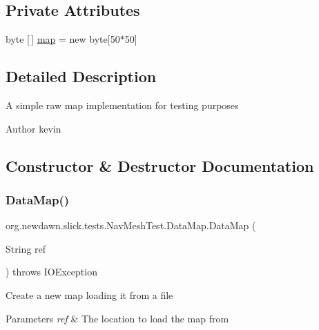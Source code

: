 \subsection*{Private Attributes}
\begin{DoxyCompactItemize}
\item 
byte \mbox{[}$\,$\mbox{]} \mbox{\hyperlink{classorg_1_1newdawn_1_1slick_1_1tests_1_1_nav_mesh_test_1_1_data_map_a53320b21368a0f1e144396488d4ae3ee}{map}} = new byte\mbox{[}50$\ast$50\mbox{]}
\end{DoxyCompactItemize}


\subsection{Detailed Description}
A simple raw map implementation for testing purposes

\begin{DoxyAuthor}{Author}
kevin 
\end{DoxyAuthor}


\subsection{Constructor \& Destructor Documentation}
\mbox{\label{classorg_1_1newdawn_1_1slick_1_1tests_1_1_nav_mesh_test_1_1_data_map_a6f7a99c8153df6e09527f400345b5364}} 
\subsubsection{\texorpdfstring{Data\+Map()}{DataMap()}}
{\footnotesize\ttfamily org.\+newdawn.\+slick.\+tests.\+Nav\+Mesh\+Test.\+Data\+Map.\+Data\+Map (\begin{DoxyParamCaption}\item[{String}]{ref }\end{DoxyParamCaption}) throws I\+O\+Exception\hspace{0.3cm}{\ttfamily [inline]}}

Create a new map loading it from a file


\begin{DoxyParams}{Parameters}
{\em ref} & The location to load the map from \\
\hline
\end{DoxyParams}

